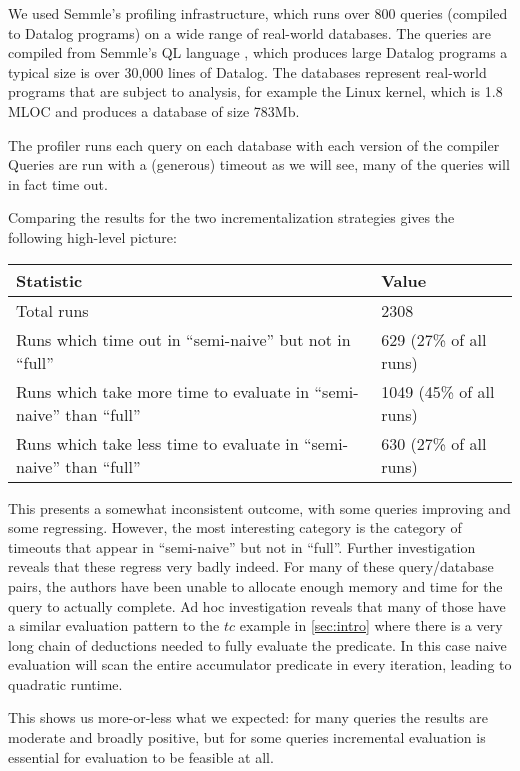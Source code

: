 We used Semmle's profiling infrastructure, which runs over 800 queries (compiled to
Datalog programs) on a wide range
of real-world databases. The queries are compiled from Semmle's QL language
\autocite{avgustinov2016ql}, which produces large Datalog programs \textemdash{}
a typical size is over 30,000 lines of Datalog. The databases represent
real-world programs that are subject to analysis, for example the Linux kernel,
which is 1.8 MLOC and produces a database of size 783Mb.

The profiler runs each query on each database with each version of the compiler
Queries are run with a (generous) timeout \textemdash{} as we will see, many
of the queries will in fact time out.

Comparing the results for the two incrementalization strategies gives
the following high-level picture:

\begin{center}
  \begin{tabular} {l l}
    Statistic & Value \\
    \toprule
    Total runs & 2308\\
    Runs which time out in ``semi-naive'' but not in ``full'' & 629 (27\% of all runs)\\
    Runs which take more time to evaluate in ``semi-naive'' than ``full'' & 1049 (45\% of all runs)\\
    Runs which take less time to evaluate in ``semi-naive'' than ``full'' & 630 (27\% of all runs)\\
    \bottomrule
  \end{tabular}
\end{center}
\medskip

This presents a somewhat inconsistent outcome, with some queries improving and some
regressing. However, the most interesting category is the category of timeouts
that appear in ``semi-naive'' but not in ``full''.
Further investigation reveals that these regress very badly indeed. For many of
these query/database pairs, the authors have been unable to allocate enough memory and time for
the query to actually complete. Ad hoc investigation reveals that many of those
have a similar evaluation pattern to the $tc$ example in \cref{sec:intro}
\textemdash{} where there is a very long chain of deductions needed to fully
evaluate the predicate. In this case naive evaluation will scan the entire
accumulator predicate in every iteration, leading to quadratic runtime. 

This shows us more-or-less what we expected: for many queries the results are
moderate and broadly positive, but for some queries incremental evaluation is
essential for evaluation to be feasible at all.


